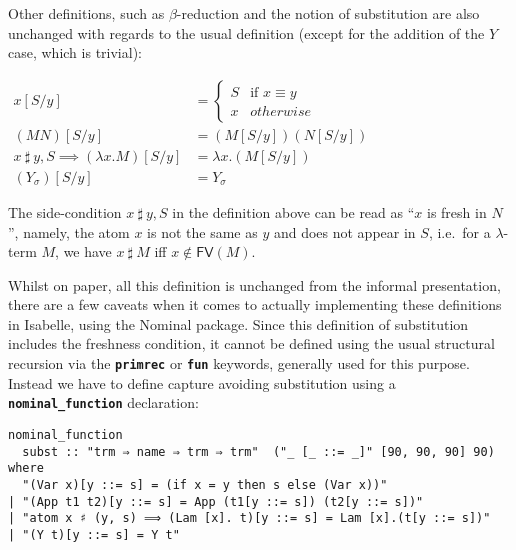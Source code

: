 \documentclass[a4paper, 12pt, twoside]{style/ociamthesis}
\theoremstyle{plain}
\theoremstyle{definition}
\newtheorem{Definition}{Definition}[chapter]
\theoremstyle{remark}
\newcommand{\fv}{\textsf{FV}}
\renewenvironment{Definition}{\begin{OldDefinition}\begin{mdframed}[style=example, linecolor=cyan]}{\end{mdframed}\end{OldDefinition}}
\begin{document}
Other definitions, such as \(\beta\)-reduction and the notion of
substitution are also unchanged with regards to the usual definition
(except for the addition of the \(Y\) case, which is trivial):

\begin{Definition}[Capture-avoiding substitution]

\begin{center}
$\begin{aligned}
x[S/y] &= \begin{cases}
S & \text{if }x \equiv y\\
x & otherwise
\end{cases}\\
(MN)[S/y] &= (M[S/y])(N[S/y])\\
x\ \sharp\ y , S \implies (\lambda x.M)[S/y] &= \lambda x.(M[S/y])\\
(Y_\sigma)[S/y] &= Y_\sigma
\end{aligned}$
\end{center}

\end{Definition}

The side-condition \(x\ \sharp\ y , S\) in the definition above can be
read as ``\(x\) is fresh in \(N\)'', namely, the atom \(x\) is not the
same as \(y\) and does not appear in \(S\), i.e.~for a \(\lambda\)-term
\(M\), we have \(x\ \sharp\ M\) iff \(x \not\in \fv(M)\).

Whilst on paper, all this definition is unchanged from the informal
presentation, there are a few caveats when it comes to actually
implementing these definitions in Isabelle, using the Nominal package.
Since this definition of substitution includes the freshness condition,
it cannot be defined using the usual structural recursion via the
\textbf{\texttt{primrec}} or \textbf{\texttt{fun}} keywords, generally
used for this purpose. Instead we have to define capture avoiding
substitution using a \textbf{\texttt{nominal\_function}} declaration:

\begin{verbatim}
nominal_function
  subst :: "trm ⇒ name ⇒ trm ⇒ trm"  ("_ [_ ::= _]" [90, 90, 90] 90)
where
  "(Var x)[y ::= s] = (if x = y then s else (Var x))"
| "(App t1 t2)[y ::= s] = App (t1[y ::= s]) (t2[y ::= s])"
| "atom x ♯ (y, s) ⟹ (Lam [x]. t)[y ::= s] = Lam [x].(t[y ::= s])"
| "(Y t)[y ::= s] = Y t"
\end{verbatim}
\end{document}
